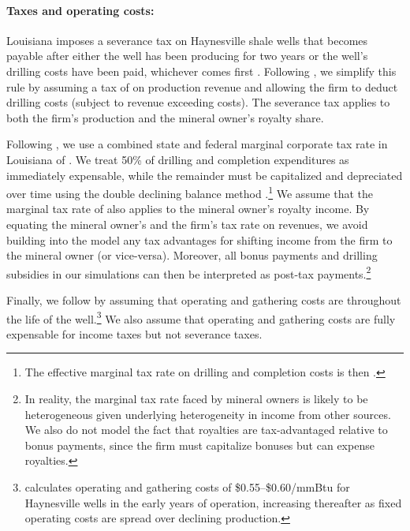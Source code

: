 \documentclass[12pt]{article}
\begin{document}
\paragraph{Taxes and operating costs:}

Louisiana imposes a severance tax on Haynesville shale wells that becomes payable after either the well has been producing for two years or the well's drilling costs have been paid, whichever comes first \citep{bib:kaiser}. Following \citet{bib:gulen}, we simplify this rule by assuming a tax of on production revenue and allowing the firm to deduct drilling costs (subject to revenue exceeding costs). The severance tax applies to both the firm's production and the mineral owner's royalty share.

Following \citet{bib:gulen}, we use a combined state and federal marginal corporate tax rate in Louisiana of \unskip. We treat 50\% of drilling and completion expenditures as immediately expensable, while the remainder must be capitalized and depreciated over time using the double declining balance method \citep{bib:metcalf}.\footnote{The effective marginal tax rate on drilling and completion costs is then \unskip.} We assume that the marginal tax rate of also applies to the mineral owner's royalty income. By equating the mineral owner's and the firm's tax rate on revenues, we avoid building into the model any tax advantages for shifting income from the firm to the mineral owner (or vice-versa). Moreover, all bonus payments and drilling subsidies in our simulations can then be interpreted as post-tax payments.\footnote{In reality, the marginal tax rate faced by mineral owners is likely to be heterogeneous given underlying heterogeneity in income from other sources. We also do not model the fact that royalties are tax-advantaged relative to bonus payments, since the firm must capitalize bonuses but can expense royalties.}

Finally, we follow \citet{bib:gulen} by assuming that operating and gathering costs are throughout the life of the well.\footnote{\citet{bib:gulen} calculates operating and gathering costs of \$0.55--\$0.60/mmBtu for Haynesville wells in the early years of operation, increasing thereafter as fixed operating costs are spread over declining production.} We also assume that operating and gathering costs are fully expensable for income taxes but not severance taxes.
\end{document}
